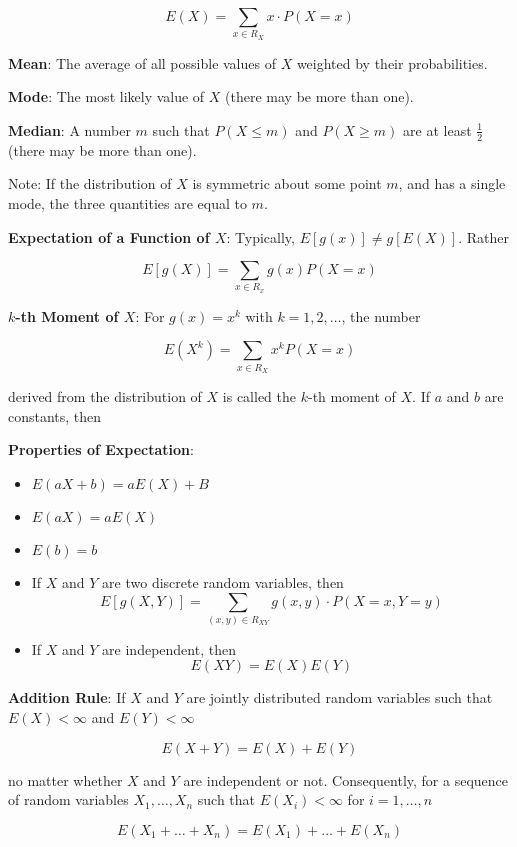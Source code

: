 \documentclass{article}
\begin{document}
\[E(X)=\underset{x\in R_X}{\sum}x\cdot P(X=x)\]

\noindent\textbf{\color{blue}Mean}: The average of all possible values of $X$ weighted by their probabilities.

\noindent\textbf{\color{blue}Mode}: The most likely value of $X$ (there may be more than one).

\noindent\textbf{\color{blue}Median}: A number $m$ such that $P(X\le m)$ and $P(X\ge m)$ are at least $\frac{1}{2}$ (there may be more than one).

Note: If the distribution of $X$ is symmetric about some point $m$, and has a single mode, the three quantities are equal to $m$.

\noindent\textbf{\color{orange}Expectation of a Function of $X$}: Typically, $E[g(x)]\ne g[E(X)]$. Rather

\[E[g(X)]=\underset{x\in R_x}{\sum}g(x)P(X=x)\]

\noindent\textbf{\color{blue}$k$-th Moment of $X$}: For $g(x)=x^k$ with $k=1,2,\ldots$, the number

\[E(X^k)=\underset{x\in R_X}{\sum}x^kP(X=x)\]

derived from the distribution of $X$ is called the $k$-th moment of $X$.
If $a$ and $b$ are constants, then

\noindent\textbf{\color{red}Properties of Expectation}:

\begin{itemize}
    \item $E(aX+b)=aE(X)+B$
    \item $E(aX)=aE(X)$
    \item $E(b)=b$
    \item If $X$ and $Y$ are two discrete random variables, then
\[E[g(X,Y)]=\underset{(x,y)\in R_{XY}}{\sum}g(x,y)\cdot P(X=x,Y=y)\]
    \item If $X$ and $Y$ are independent, then
\[E(XY)=E(X)E(Y)\]
\end{itemize}

\noindent\textbf{\color{red}Addition Rule}: If $X$ and $Y$ are jointly distributed random variables such that $E(X)<\infty$ and $E(Y)<\infty$

\[E(X+Y)=E(X)+E(Y)\]

no matter whether $X$ and $Y$ are independent or not. Consequently, for a sequence of random variables $X_1,\ldots,X_n$ such that $E(X_i)<\infty$ for $i=1,\ldots,n$

\[E(X_1+\ldots+X_n)=E(X_1)+\ldots+E(X_n)\]
\end{document}
